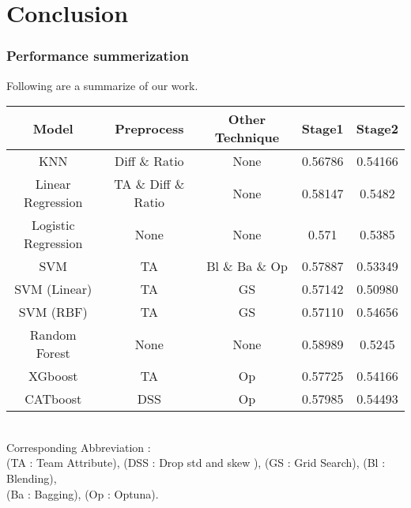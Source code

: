 \section{Conclusion}
\subsubsection*{Performance summerization}
Following are a summarize of our work.
\begin{table}[h]
    \centering
    \begin{tabular}{|c|c|c|c|c|}
    \hline
    Model & Preprocess & Other Technique & Stage1 & Stage2 \\ \hline\hline
    KNN   & Diff \& Ratio   & None & 0.56786 & 0.54166  \\ \hline
    Linear Regression & TA \& Diff \& Ratio & None & 0.58147 & 0.5482 \\ \hline
    Logistic Regression & None & None & 0.571 & 0.5385 \\ \hline
    SVM & TA & Bl \& Ba \& Op & 0.57887 & 0.53349 \\ \hline
    SVM (Linear) & TA & GS & 0.57142 & 0.50980 \\ \hline
    SVM (RBF) & TA & GS & 0.57110 & 0.54656 \\ \hline
    Random Forest & None & None & 0.58989 & 0.5245 \\ \hline
    XGboost & TA & Op & 0.57725 & 0.54166 \\ \hline
    CATboost & DSS & Op & 0.57985 & 0.54493 \\ \hline
    \end{tabular}
    \label{tab:example_table}
\end{table}\\
Corresponding Abbreviation : \\
(TA : Team Attribute), (DSS : Drop std and skew ), (GS : Grid Search), (Bl : Blending),\\
 (Ba : Bagging), (Op : Optuna).

